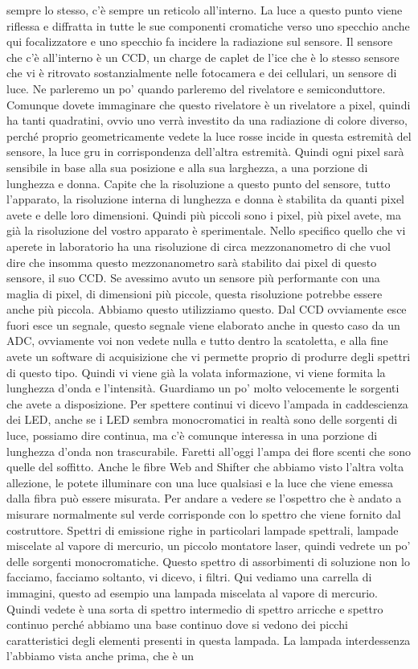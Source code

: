 {sempre lo stesso, c'è sempre un reticolo all'interno. La luce a questo punto viene riflessa e diffratta in tutte le sue componenti cromatiche verso uno specchio anche qui focalizzatore e uno specchio fa incidere la radiazione sul sensore. Il sensore che c'è all'interno è un CCD, un charge de caplet de l'ice che è lo stesso sensore che vi è ritrovato sostanzialmente nelle fotocamera e dei cellulari, un sensore di luce. Ne parleremo un po' quando parleremo del rivelatore e semiconduttore. Comunque dovete immaginare che questo rivelatore è un rivelatore a pixel, quindi ha tanti quadratini, ovvio uno verrà investito da una radiazione di colore diverso, perché proprio geometricamente vedete la luce rosse incide in questa estremità del sensore, la luce gru in corrispondenza dell'altra estremità. Quindi ogni pixel sarà sensibile in base alla sua posizione e alla sua larghezza, a una porzione di lunghezza e donna. Capite che la risoluzione a questo punto del sensore, tutto l'apparato, la risoluzione interna di lunghezza e donna è stabilita da quanti pixel avete e delle loro dimensioni. Quindi più piccoli sono i pixel, più pixel avete, ma già la risoluzione del vostro apparato è sperimentale. Nello specifico quello che vi aperete in laboratorio ha una risoluzione di circa mezzonanometro di che vuol dire che insomma questo mezzonanometro sarà stabilito dai pixel di questo sensore, il suo CCD. Se avessimo avuto un sensore più performante con una maglia di pixel, di dimensioni più piccole, questa risoluzione potrebbe essere anche più piccola. Abbiamo questo utilizziamo questo. Dal CCD ovviamente esce fuori esce un segnale, questo segnale viene elaborato anche in questo caso da un ADC, ovviamente voi non vedete nulla e tutto dentro la scatoletta, e alla fine avete un software di acquisizione che vi permette proprio di produrre degli spettri di questo tipo. Quindi vi viene già la volata informazione, vi viene formita la lunghezza d'onda e l'intensità. Guardiamo un po' molto velocemente le sorgenti che avete a disposizione. Per spettere continui vi dicevo l'ampada in caddescienza dei LED, anche se i LED sembra monocromatici in realtà sono delle sorgenti di luce, possiamo dire continua, ma c'è comunque interessa in una porzione di lunghezza d'onda non trascurabile. Faretti all'oggi l'ampa dei flore scenti che sono quelle del soffitto. Anche le fibre Web and Shifter che abbiamo visto l'altra volta allezione, le potete illuminare con una luce qualsiasi e la luce che viene emessa dalla fibra può essere misurata. Per andare a vedere se l'ospettro che è andato a misurare normalmente sul verde corrisponde con lo spettro che viene fornito dal costruttore. Spettri di emissione righe in particolari lampade spettrali, lampade miscelate al vapore di mercurio, un piccolo montatore laser, quindi vedrete un po' delle sorgenti monocromatiche. Questo spettro di assorbimenti di soluzione non lo facciamo, facciamo soltanto, vi dicevo, i filtri. Qui vediamo una carrella di immagini, questo ad esempio una lampada miscelata al vapore di mercurio. Quindi vedete è una sorta di spettro intermedio di spettro arricche e spettro continuo perché abbiamo una base continuo dove si vedono dei picchi caratteristici degli elementi presenti in questa lampada. La lampada interdessenza l'abbiamo vista anche prima, che è un }
